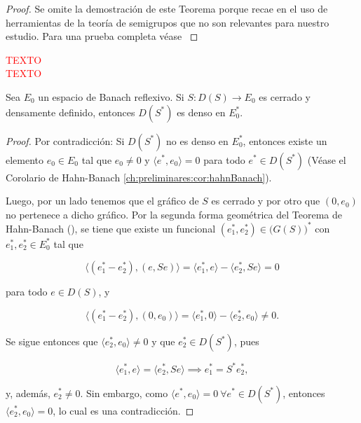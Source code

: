 \begin{proof}
    Se omite la demostración de este Teorema porque recae en el uso de herramientas de la teoría de semigrupos que no son  relevantes para nuestro estudio. Para una prueba completa véase \cite[Teorema~1.6.1]{carvalho-2001-equ-par-sem}
\end{proof}

\textcolor{red}{TEXTO}\\

\textcolor{red}{TEXTO}\\

\begin{Lema}
    \label{ch:semigrupos:section:dual:lemma:densidadDelDomAdjuntoDelGenerador}

    Sea $E_0$ un espacio de Banach reflexivo. Si $S : D(S) \rightarrow E_0$ es cerrado y densamente definido, entonces $D(S^*)$ es denso en $E_0^*$.
\end{Lema}

\begin{proof}
    Por contradicción: Si $D(S^*)$ no es denso en $E_0^*$, entonces existe un elemento $e_0 \in E_0$ tal que $e_0 \neq 0$ y $\langle e^*, e_0 \rangle = 0$ para todo $e^* \in D(S^*)$ (Véase el Corolario de Hahn-Banach \ref{ch:preliminares:cor:hahnBanach}).

    Luego, por un lado tenemos que el gráfico de $S$ es cerrado y por otro que $(0,e_0)$ no pertenece a dicho gráfico. Por la segunda forma geométrica del Teorema de Hahn-Banach (\cite[Teorema~1.7]{brezis-2011-fun-ana-sob}), se tiene que existe un funcional $(e_1^*, e_2^*) \in \big(G(S)\big)^*$ con $e_1^*, e_2^* \in E_0^*$ tal que

    \[\langle (e_1^* - e_2^*), (e, Se) \rangle = \langle e_1^*, e\rangle - \langle e_2^*, Se \rangle = 0\]

    para todo $e \in D(S)$, y

    \[\langle (e_1^* - e_2^*), (0,e_0)\rangle = \langle e_1^*, 0 \rangle - \langle e_2^*, e_0 \rangle \neq 0.\]

    Se sigue entonces que $\langle e_2^*, e_0 \rangle \neq 0$ y que $e_2^* \in D(S^*)$, pues

    \[\langle e_1^*, e \rangle = \langle e_2^*, Se \rangle \implies e_1^* = S^* e_2^*,\]

    y, además, $e_2^* \neq 0$. Sin embargo, como $\langle e^*, e_0 \rangle = 0 \ \forall e^* \in D(S^*)$, entonces $\langle e_2^*, e_0 \rangle = 0$, lo cual es una contradicción.
\end{proof}

